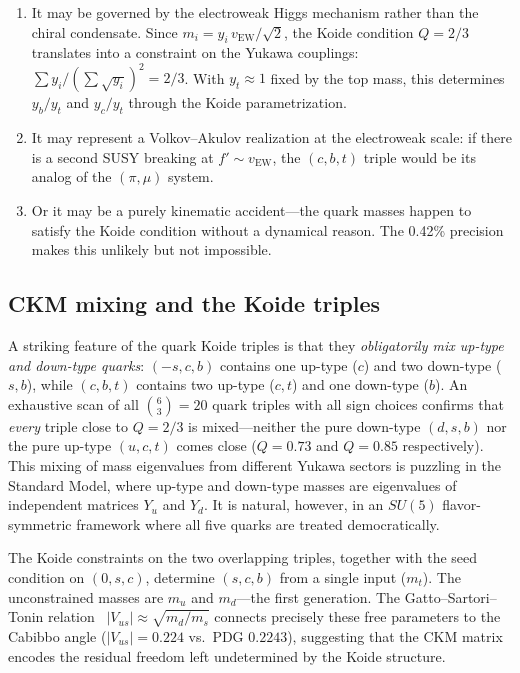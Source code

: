 \documentclass[12pt,a4paper]{article}
\begin{document}
\begin{enumerate}
\item It may be governed by the electroweak Higgs mechanism rather
than the chiral condensate. Since $m_i = y_i\,v_{\text{EW}}/\sqrt{2}$, the Koide condition
$Q = 2/3$ translates into a constraint on the Yukawa couplings:
$\sum y_i/(\sum \sqrt{y_i})^2 = 2/3$.
With $y_t \approx 1$ fixed by the top mass, this determines
$y_b/y_t$ and $y_c/y_t$ through the Koide parametrization.

\item It may represent a Volkov--Akulov realization at the
electroweak scale: if there is a second SUSY breaking at
$f' \sim v_{\text{EW}}$, the $(c,b,t)$ triple would be its
analog of the $(\pi, \mu)$ system.

\item Or it may be a purely kinematic accident---the quark masses
happen to satisfy the Koide condition without a dynamical reason.
The 0.42\% precision makes this unlikely but not impossible.
\end{enumerate}

\subsection{CKM mixing and the Koide triples}

A striking feature of the quark Koide triples is that they
\emph{obligatorily mix up-type and down-type quarks}: $(-s,c,b)$
contains one up-type ($c$) and two down-type ($s,b$), while
$(c,b,t)$ contains two up-type ($c,t$) and one down-type ($b$). An
exhaustive scan of all $\binom{6}{3} = 20$ quark triples with all
sign choices confirms that \emph{every} triple close to $Q = 2/3$ is
mixed---neither the pure down-type $(d,s,b)$ nor the pure up-type
$(u,c,t)$ comes close ($Q = 0.73$ and $Q = 0.85$ respectively).
This mixing of mass eigenvalues from different Yukawa sectors is
puzzling in the Standard Model, where up-type and down-type masses are
eigenvalues of independent matrices $Y_u$ and $Y_d$. It is natural,
however, in an $SU(5)$ flavor-symmetric framework where all five
quarks are treated democratically.

The Koide constraints on the two overlapping triples, together with
the seed condition on $(0,s,c)$, determine $(s,c,b)$ from a single
input ($m_t$). The unconstrained masses are $m_u$ and $m_d$---the
first generation. The Gatto--Sartori--Tonin relation~\cite{GST1968}
$|V_{us}| \approx \sqrt{m_d/m_s}$ connects precisely these free
parameters to the Cabibbo angle ($|V_{us}| = 0.224$ vs.\ PDG $0.2243$),
suggesting that the CKM matrix
encodes the residual freedom left undetermined by the Koide
structure.
\end{document}
